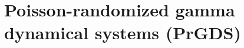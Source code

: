 \documentclass{article}
\begin{document}














\section{Poisson-randomized gamma dynamical systems (PrGDS)}
\label{sec:prgds}
\end{document}
